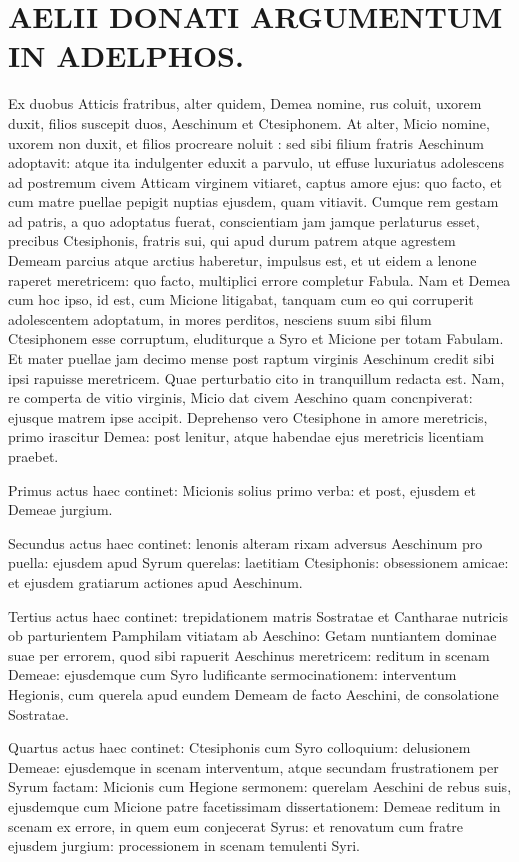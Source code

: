 \section*{AELII DONATI ARGUMENTUM IN ADELPHOS.}

Ex duobus Atticis fratribus, alter quidem, Demea nomine, rus coluit, uxorem duxit, filios suscepit duos, Aeschinum et Ctesiphonem. At alter, Micio nomine, uxorem non duxit, et filios procreare noluit : sed sibi filium fratris Aeschinum adoptavit: atque ita indulgenter eduxit a parvulo, ut effuse luxuriatus adolescens ad postremum civem Atticam virginem vitiaret, captus amore ejus: quo facto, et cum matre puellae pepigit nuptias ejusdem, quam vitiavit. Cumque rem gestam ad patris, a quo adoptatus fuerat, conscientiam jam jamque perlaturus esset, precibus Ctesiphonis, fratris sui, qui apud durum patrem atque agrestem Demeam parcius atque arctius haberetur, impulsus est, et ut eidem a lenone raperet meretricem: quo facto, multiplici errore completur Fabula. Nam et Demea cum hoc ipso, id est, cum Micione litigabat, tanquam cum eo qui corruperit adolescentem adoptatum, in mores perditos, nesciens suum sibi filum Ctesiphonem esse corruptum, eluditurque a Syro et Micione per totam Fabulam. Et mater puellae jam decimo mense post raptum virginis Aeschinum credit sibi ipsi rapuisse meretricem. Quae perturbatio cito in tranquillum redacta est. Nam, re comperta de vitio virginis, Micio dat civem Aeschino quam concnpiverat: ejusque matrem ipse accipit. Deprehenso vero Ctesiphone in amore meretricis, primo irascitur Demea: post lenitur, atque habendae ejus meretricis licentiam praebet. 

Primus actus haec continet: Micionis solius primo verba: et post, ejusdem et Demeae jurgium. 

Secundus actus haec continet: lenonis alteram rixam adversus Aeschinum pro puella: ejusdem apud Syrum querelas: laetitiam Ctesiphonis: obsessionem amicae: et ejusdem gratiarum actiones apud Aeschinum. 

Tertius actus haec continet: trepidationem matris Sostratae et Cantharae nutricis ob parturientem Pamphilam vitiatam ab Aeschino: Getam nuntiantem dominae suae per errorem, quod sibi rapuerit Aeschinus meretricem: reditum in scenam Demeae: ejusdemque cum Syro ludificante sermocinationem: interventum Hegionis, cum querela apud eundem Demeam de facto Aeschini, de  consolatione Sostratae. 

Quartus actus haec continet: Ctesiphonis cum Syro colloquium: delusionem Demeae: ejusdemque in scenam interventum, atque secundam frustrationem per Syrum factam: Micionis cum Hegione sermonem: querelam Aeschini de rebus suis, ejusdemque cum Micione patre facetissimam dissertationem: Demeae reditum in scenam ex errore, in quem eum conjecerat Syrus: et renovatum cum fratre ejusdem jurgium: processionem in scenam temulenti Syri.


